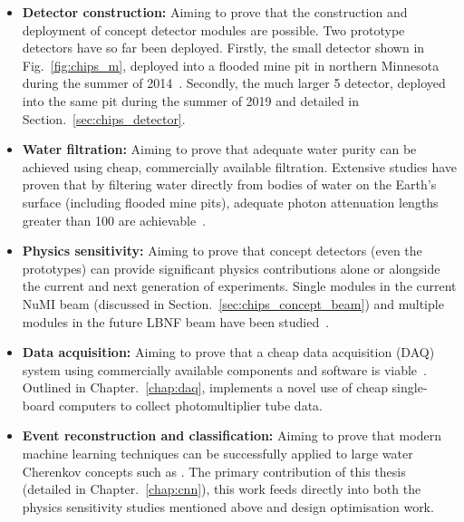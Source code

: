 \begin{itemize}
    \item \textbf{Detector construction:} Aiming to prove that the construction and deployment of
          \chips concept detector modules are possible. Two prototype detectors have so far been
          deployed. Firstly, the small \chipsm detector shown in Fig.~\ref{fig:chips_m}, deployed
          into a flooded mine pit in northern Minnesota during the summer of 2014~\cite{perch2015,
              pfutznerProto2017, pfutzner2017}. Secondly, the much larger \unit{5}{}
          \chipsfive detector, deployed into the same pit during the summer of 2019 and detailed
          in Section.~\ref{sec:chips_detector}.

    \item \textbf{Water filtration:} Aiming to prove that adequate water purity can be achieved
          using cheap, commercially available filtration. Extensive studies have proven that by
          filtering water directly from bodies of water on the Earth's surface (including flooded
          mine pits), adequate photon attenuation lengths greater than \unit{100}{} are
          achievable~\cite{amat2017, campbell2020}.

    \item \textbf{Physics sensitivity:} Aiming to prove that \chips concept detectors (even the
          prototypes) can provide significant physics contributions alone or alongside the current
          and next generation of experiments. Single modules in the current NuMI beam (discussed
          in Section.~\ref{sec:chips_concept_beam}) and multiple modules in the future LBNF beam
          have been studied~\cite{pfutzner2017, adde2016, lang2015}.

    \item \textbf{Data acquisition:} Aiming to prove that a cheap data acquisition (DAQ) system
          using commercially available components and software is viable~\cite{eijk2018}. Outlined
          in Chapter.~\ref{chap:daq}, \chips implements a novel use of cheap single-board
          computers to collect photomultiplier tube data.

    \item \textbf{Event reconstruction and classification:} Aiming to prove that modern machine
          learning techniques can be successfully applied to large water Cherenkov concepts such
          as \chips. The primary contribution of this thesis (detailed in
          Chapter.~\ref{chap:cnn}), this work feeds directly into both the physics sensitivity
          studies mentioned above and design optimisation work.
\end{itemize}

